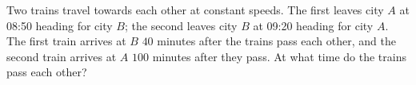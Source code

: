 Two trains travel towards each other at constant speeds. The first leaves city $A$ at 08:50 heading for city $B$; the second leaves city $B$ at 09:20 heading for city $A$. The first train arrives at $B$ $40$ minutes after the trains pass each other, and the second train arrives at $A$ $100$ minutes after they pass. At what time do the trains pass each other?
